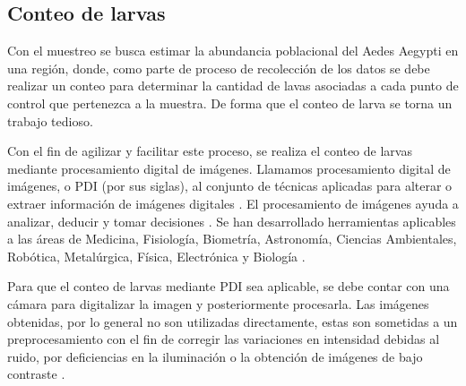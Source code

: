 \subsection{Conteo de larvas}
Con el muestreo se busca estimar la abundancia poblacional del Aedes Aegypti en una región, donde,
como parte de proceso de recolección de los datos se debe realizar un conteo para determinar la
cantidad de lavas asociadas a cada punto de control que pertenezca a la muestra. De forma que el
conteo de larva se torna un trabajo tedioso.

Con el fin de agilizar y facilitar este proceso, se realiza el conteo de larvas mediante
procesamiento digital de imágenes. Llamamos procesamiento digital de imágenes, o PDI (por sus
siglas), al conjunto de técnicas aplicadas para alterar o extraer información de imágenes digitales
\cite{moreira2009implementacion, ortiz2013procesamiento}. El procesamiento de imágenes ayuda a
analizar, deducir y tomar decisiones \cite{ortiz2013procesamiento}. Se han desarrollado
herramientas aplicables a las áreas de Medicina, Fisiología, Biometría, Astronomía, Ciencias
Ambientales, Robótica, Metalúrgica, Física, Electrónica y Biología \cite{ortiz2013procesamiento, santillan2008deteccion, moreira2009implementacion}.

Para que el conteo de larvas mediante PDI sea aplicable, se debe contar con una cámara para
digitalizar la imagen y posteriormente procesarla. Las imágenes obtenidas, por lo general no son
utilizadas directamente, estas son sometidas a un preprocesamiento con el fin de corregir las
variaciones en intensidad debidas al ruido, por deficiencias en la iluminación o la obtención de
imágenes de bajo contraste \citep{santillan2008deteccion}.

